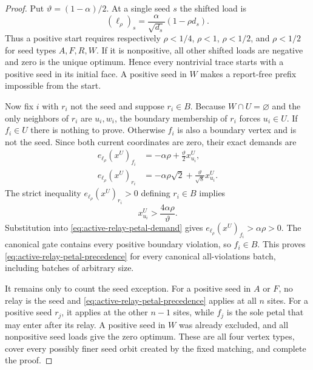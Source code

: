 \begin{proof}
Put $\vartheta=(1-\alpha)/2$.  At a single seed $s$ the shifted load is
\begin{equation*}
 (\ell_\rho)_s=\frac{\alpha}{\sqrt{d_s}}(1-\rho d_s).
\end{equation*}
Thus a positive start requires respectively $\rho<1/4$, $\rho<1$,
$\rho<1/2$, and $\rho<1/2$ for seed types $A,F,R,W$.
If it is nonpositive, all other shifted loads are negative and zero is the
unique optimum.  Hence every nontrivial trace starts with a positive seed in
its initial face.  A positive seed in $W$ makes a report-free prefix
impossible from the start.

Now fix $i$ with $r_i$ not the seed and suppose $r_i\in B$.  Because
$W\cap U=\varnothing$ and the only neighbors of $r_i$ are $u_i,w_i$, the
boundary membership of $r_i$ forces $u_i\in U$.  If $f_i\in U$ there is
nothing to prove.  Otherwise $f_i$ is also a boundary vertex and is not the
seed.  Since both current coordinates are zero, their exact demands are
\begin{align}
 e_{\ell_\rho}(x^U)_{f_i}
  &=-\alpha\rho+\frac{\vartheta}{2}x^U_{u_i},
 \label{eq:active-relay-petal-demand}\\
 e_{\ell_\rho}(x^U)_{r_i}
  &=-\alpha\rho\sqrt2+\frac{\vartheta}{\sqrt8}x^U_{u_i}.
 \label{eq:active-relay-demand}
\end{align}
The strict inequality $e_{\ell_\rho}(x^U)_{r_i}>0$ defining $r_i\in B$
implies
\begin{equation}
 x^U_{u_i}>\frac{4\alpha\rho}{\vartheta}.
 \label{eq:active-relay-anchor-threshold}
\end{equation}
Substitution into \cref{eq:active-relay-petal-demand} gives
$e_{\ell_\rho}(x^U)_{f_i}>\alpha\rho>0$.  The canonical gate contains every
positive boundary violation, so $f_i\in B$.  This proves
\cref{eq:active-relay-petal-precedence} for every canonical all-violations
batch, including batches of arbitrary size.

It remains only to count the seed exception.  For a positive seed in $A$ or
$F$, no relay is the seed and \cref{eq:active-relay-petal-precedence} applies
at all $n$ sites.  For a positive seed $r_j$, it applies at the other $n-1$
sites, while $f_j$ is the sole petal that may enter after its relay.  A
positive seed in $W$ was already excluded, and all nonpositive seed loads give
the zero optimum.  These are all four vertex types, cover every possibly finer
seed orbit created by the fixed matching, and complete the proof.
\end{proof}

